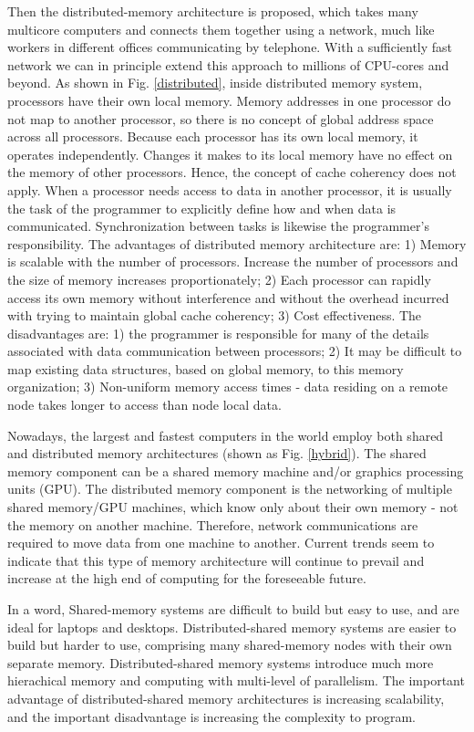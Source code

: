 Then the distributed-memory architecture is proposed, which takes many multicore computers and connects them together using a network, much like workers in different offices communicating by telephone. With a sufficiently fast network we can in principle extend this approach to millions of CPU-cores and beyond. As shown in Fig. \ref{distributed}, inside distributed memory system, processors have their own local memory. Memory addresses in one processor do not map to another processor, so there is no concept of global address space across all processors. Because each processor has its own local memory, it operates independently. Changes it makes to its local memory have no effect on the memory of other processors. Hence, the concept of cache coherency does not apply. When a processor needs access to data in another processor, it is usually the task of the programmer to explicitly define how and when data is communicated. Synchronization between tasks is likewise the programmer's responsibility. The advantages of distributed memory architecture are: 1) Memory is scalable with the number of processors. Increase the number of processors and the size of memory increases proportionately; 2) Each processor can rapidly access its own memory without interference and without the overhead incurred with trying to maintain global cache coherency; 3) Cost effectiveness. The disadvantages are: 1) the programmer is responsible for many of the details associated with data communication between processors; 2) It may be difficult to map existing data structures, based on global memory, to this memory organization; 3) Non-uniform memory access times - data residing on a remote node takes longer to access than node local data.

Nowadays, the largest and fastest computers in the world employ both shared and distributed memory architectures (shown as Fig. \ref{hybrid}). The shared memory component can be a shared memory machine and/or graphics processing units (GPU). The distributed memory component is the networking of multiple shared memory/GPU machines, which know only about their own memory - not the memory on another machine. Therefore, network communications are required to move data from one machine to another. Current trends seem to indicate that this type of memory architecture will continue to prevail and increase at the high end of computing for the foreseeable future.

In a word, Shared-memory systems are difficult to build but easy to use, and are ideal for laptops and desktops. Distributed-shared memory systems are easier to build but harder to use, comprising many shared-memory nodes with their own separate memory. Distributed-shared memory systems introduce much more hierachical memory and computing with multi-level of parallelism. The important advantage of distributed-shared memory architectures is increasing scalability, and the important disadvantage is increasing the complexity to program.

